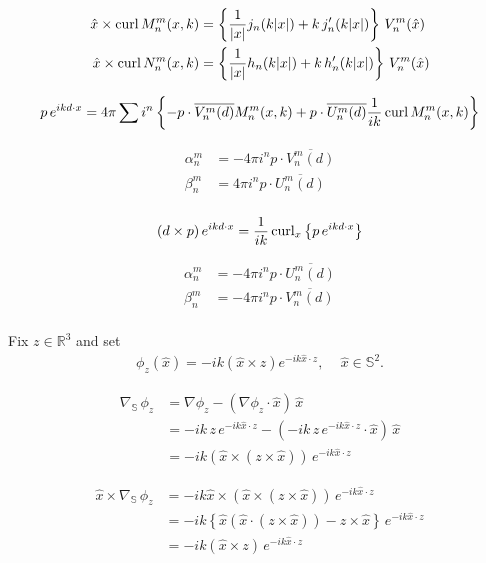 \begin{align*}
  \hat{x}\times\operatorname{curl} M_n^m(x, k) &= \left\{\frac{1}{|x|}j_n(k|x|) + k\,j_n'(k|x|)\right\}\,V_n^m(\hat{x})\\
  \hat{x}\times\operatorname{curl} N_n^m(x, k) &= \left\{\frac{1}{|x|}h_n(k|x|) + k\,h_n'(k|x|)\right\}\,V_n^m(\hat{x})\\
\end{align*}

\begin{align*}
  p\,e^{i k d\cdot x} = 4\pi\sum i^n \left\{-p\cdot\overline{V_n^m(d)}M_n^m(x, k) + p\cdot\overline{U_n^m(d)}\frac{1}{ik}\operatorname{curl} M_n^m(x, k)\right\}
\end{align*}

\begin{align*}
  \alpha_n^m &= -4\pi i^n p\cdot\overline{V_n^m(d)} \\
  \beta_n^m  &= 4\pi i^n p\cdot\overline{U_n^m(d)} \\
\end{align*}

\begin{align*}
  (d\times p)\,e^{i k d\cdot x} = \frac{1}{ik}\operatorname{curl}_x\left\{p\,e^{i k d\cdot x}\right\}
\end{align*}

\begin{align*}
  \alpha_n^m &= -4\pi i^n p\cdot\overline{U_n^m(d)} \\
  \beta_n^m  &= -4\pi i^n p\cdot\overline{V_n^m(d)} \\
\end{align*}

Fix $z\in\mathbb{R}^3$ and set
\begin{align*}
  \phi_z(\hat{x}) = -ik\left(\hat{x}\times z\right) e^{-ik\hat{x}\cdot z},\,\quad\hat{x}\in\mathbb{S}^2.
\end{align*}

\begin{align*}
  \nabla_{\mathbb{S}}\,\phi_z &= \nabla\phi_z - (\nabla\phi_z\cdot\hat{x})\,\hat{x} \\
  &= -ik\,z\,e^{-ik\hat{x}\cdot z} - (-ik\,z\,e^{-ik\hat{x}\cdot z}\cdot\hat{x})\,\hat{x} \\
  &= -ik\left(\hat{x}\times(z\times\hat{x})\right)\,e^{-ik\hat{x}\cdot z}
\end{align*}

\begin{align*}
  \hat{x}\times\nabla_{\mathbb{S}}\,\phi_z &= -ik\hat{x}\times\left(\hat{x}\times(z\times\hat{x})\right)\,e^{-ik\hat{x}\cdot z} \\
  &= -ik\left\{\hat{x}\left(\hat{x}\cdot\left(z\times\hat{x}\right)\right)-z\times\hat{x}\right\}\,e^{-ik\hat{x}\cdot z} \\
  &= -ik(\hat{x}\times z)\,e^{-ik\hat{x}\cdot z}
\end{align*}
